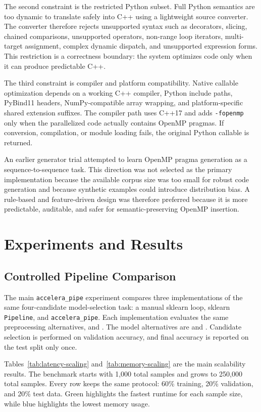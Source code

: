 \documentclass[12pt,a4paper,oneside]{report}
\begin{document}
The second constraint is the restricted Python subset. Full Python semantics are
too dynamic to translate safely into C++ using a lightweight source converter.
The converter therefore rejects unsupported syntax such as decorators, slicing,
chained comparisons, unsupported operators, non-range loop iterators,
multi-target assignment, complex dynamic dispatch, and unsupported expression
forms. This restriction is a correctness boundary: the system optimizes code
only when it can produce predictable C++.

The third constraint is compiler and platform compatibility. Native callable
optimization depends on a working C++ compiler, Python include paths, PyBind11
headers, NumPy-compatible array wrapping, and platform-specific shared extension
suffixes. The compiler path uses C++17 and adds \texttt{-fopenmp} only when the
parallelized code actually contains OpenMP pragmas. If conversion, compilation,
or module loading fails, the original Python callable is returned.

An earlier generator trial attempted to learn OpenMP pragma generation as a
sequence-to-sequence task. This direction was not selected as the primary
implementation because the available corpus size was too small for robust code
generation and because synthetic examples could introduce distribution bias. A
rule-based and feature-driven design was therefore preferred because it is more
predictable, auditable, and safer for semantic-preserving OpenMP insertion.

\chapter{Experiments and Results}
\label{chap:experiments-and-results}
\section{Controlled Pipeline Comparison}
The main \texttt{accelera\_pipe} experiment compares three implementations of
the same four-candidate model-selection task: a manual sklearn loop, sklearn
\texttt{Pipeline}, and \texttt{accelera\_pipe}. Each implementation evaluates
the same preprocessing alternatives,  and
. The model alternatives are
 and . Candidate selection is performed
on validation accuracy, and final accuracy is reported on the test split only
once.

Tables~\ref{tab:latency-scaling} and~\ref{tab:memory-scaling} are the main scalability results. The benchmark starts with 1,000 total samples and grows to 250,000 total samples. Every row keeps the same protocol: 60\% training, 20\% validation, and 20\% test data. Green highlights the fastest runtime for each sample size, while blue highlights the lowest memory usage.
\end{document}
